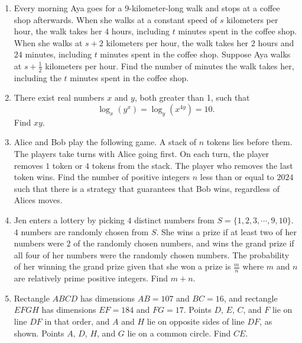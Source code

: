 \documentclass{article}
\begin{document}
\begin{enumerate}[label=\arabic*., itemsep=0.5em]\item Every morning Aya goes for a \(9\)-kilometer-long walk and stops at a coffee shop afterwards. When she walks at a constant speed of \(s\) kilometers per hour, the walk takes her \(4\) hours, including \(t\) minutes spent in the coffee shop. When she walks at \(s + 2\) kilometers per hour, the walk takes her \(2\) hours and \(24\) minutes, including \(t\) minutes spent in the coffee shop. Suppose Aya walks at \(s + \frac{1}{2}\)
kilometers per hour. Find the number of minutes the walk takes her, including the \(t\) minutes spent in the coffee shop.\par \vspace{0.5em}\item There exist real numbers \(x\) and \(y\), both greater than 1, such that 
\begin{equation*}
\log_x(y^x) = \log_y(x^{4y}) = 10.
\end{equation*}
 Find \(xy\).\par \vspace{0.5em}\item Alice and Bob play the following game. A stack of \(n\) tokens lies before them. The players take turns with Alice going first. On each turn, the player removes \(1\) token or \(4\) tokens from the stack. The player who removes the last token wins. Find the number of positive integers \(n\) less than or equal to \(2024\) such that there is a strategy that guarantees that Bob wins, regardless of Alices moves.\par \vspace{0.5em}\item Jen enters a lottery by picking \(4\) distinct numbers from \(S=\{1,2,3,\cdots,9,10\}.\) \(4\) numbers are randomly chosen from \(S.\) She wins a prize if at least two of her numbers were \(2\) of the randomly chosen numbers, and wins the grand prize if all four of her numbers were the randomly chosen numbers. The probability of her winning the grand prize given that she won a prize is \(\tfrac{m}{n}\) where \(m\) and \(n\) are relatively prime positive integers. Find \(m+n\).\par \vspace{0.5em}\item Rectangle \(ABCD\) has dimensions \(AB = 107\) and \(BC = 16\), and rectangle \(EFGH\) has dimensions \(EF = 184\) and \(FG = 17\). Points \(D\), \(E\), \(C\), and \(F\) lie on line \(DF\) in that order, and \(A\) and \(H\) lie on opposite sides of line \(DF\), as shown. Points \(A\), \(D\), \(H\), and \(G\) lie on a common circle. Find \(CE\).



\end{enumerate}
\end{document}
